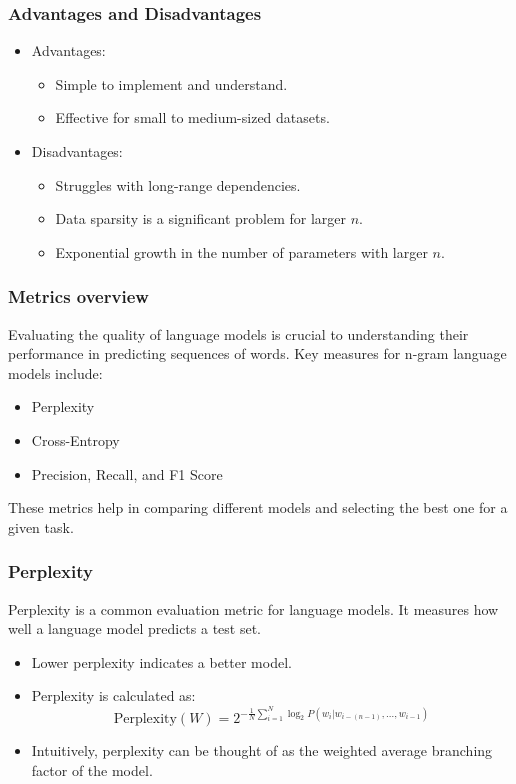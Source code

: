 \documentclass{beamer}
\begin{document}
\begin{frame}
\frametitle{Advantages and Disadvantages}
\begin{itemize}
    \item Advantages:
    \begin{itemize}
        \item Simple to implement and understand.
        \item Effective for small to medium-sized datasets.
    \end{itemize}
    \item Disadvantages:
    \begin{itemize}
        \item Struggles with long-range dependencies.
        \item Data sparsity is a significant problem for larger \( n \).
        \item Exponential growth in the number of parameters with larger \( n \).
    \end{itemize}
\end{itemize}
\end{frame}

\begin{frame}
\frametitle{Metrics overview}
Evaluating the quality of language models is crucial to understanding their performance in predicting sequences of words. Key measures for n-gram language models include:
\begin{itemize}
    \item Perplexity
    \item Cross-Entropy
    \item Precision, Recall, and F1 Score
\end{itemize}
These metrics help in comparing different models and selecting the best one for a given task.
\end{frame}

\begin{frame}
\frametitle{Perplexity}
Perplexity is a common evaluation metric for language models. It measures how well a language model predicts a test set.
\begin{itemize}
    \item Lower perplexity indicates a better model.
    \item Perplexity is calculated as:
    \[
    \text{Perplexity}(W) = 2^{-\frac{1}{N} \sum_{i=1}^{N} \log_2 P(w_i | w_{i-(n-1)}, \dots, w_{i-1})}
    \]
    \item Intuitively, perplexity can be thought of as the weighted average branching factor of the model.
\end{itemize}
\end{frame}
\end{document}
